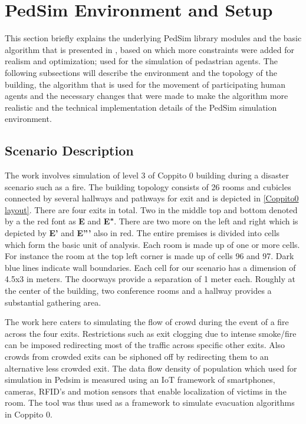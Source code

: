
\chapter{PedSim Environment and Setup\label{ch:PedSim Environment and Setup}}

This section briefly explains the underlying PedSim library modules and the basic algorithm that is presented in \cite{ref5}, based on which more constraints were added for realism and optimization; used for the simulation of pedastrian agents. The following subsections will describe the environment and the topology of the building, the algorithm that is used for the movement of participating human agents and the necessary changes that were made to make the algorithm more realistic and the technical implementation details of the PedSim simulation environment. 

\section{Scenario Description}
\label{sec:implementation:Scenario Description}

The work involves simulation of level 3 of Coppito 0 building during a disaster scenario such as a fire. The building topology consists of 26 rooms and cubicles connected by several hallways and pathways for exit and is depicted in \ref{Coppito0 layout}. There are four exits in total. Two in the middle top and bottom denoted by a the red font as \textbf{E} and \textbf{E}\textbf{"}. There are two more on the left and right which is depicted by \textbf{E}\textbf{'} and \textbf{E}\textbf{'''} also in red. The entire premises is divided into cells which form the basic unit of analysis. Each room is made up of one or more cells. For instance the room at the top left corner is made up of cells 96 and 97. Dark blue lines indicate wall boundaries. Each cell for our scenario has a dimension of 4.5x3 in meters. The doorways provide a separation of 1 meter each. Roughly at the center of the building, two conference rooms and a hallway provides a substantial gathering area.

The work here caters to simulating the flow of crowd during the event of a fire across the four exits. Restrictions such as exit clogging due to intense smoke/fire can be imposed redirecting most of the traffic across specific other exits. Also crowds from crowded exits can be siphoned off by redirecting them to an alternative less crowded exit. The data flow density of population which used for simulation in Pedsim is measured using an IoT framework of smartphones, cameras, RFID’s and motion sensors that enable localization of victims in the room. The tool was thus used as a framework to simulate evacuation algorithms in Coppito 0. 

